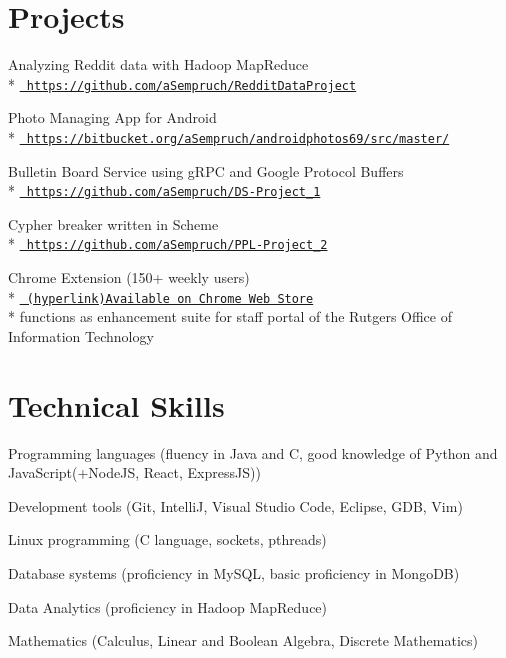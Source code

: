 \documentclass[letterpaper]{article}
\renewenvironment{itemize}{
  \begin{list}{}{
      \setlength{\leftmargin}{1.5em}
    }
  }{
  \end{list}
}
\begin{document}
\section*{Projects}

\begin{itemize}
  
  \item Analyzing Reddit data with Hadoop MapReduce \\*
  \href{https://github.com/aSempruch/RedditDataProject}{\tt
  https://github.com/aSempruch/RedditDataProject}

  \item Photo Managing App for Android \\*
  \href{https://bitbucket.org/aSempruch/androidphotos69/src/master/}{\tt
  https://bitbucket.org/aSempruch/androidphotos69/src/master/}
  
  \item Bulletin Board Service using gRPC and Google Protocol Buffers \\*
  \href{https://github.com/aSempruch/DS-Project_1}{\tt
  https://github.com/aSempruch/DS-Project\_1}
  
  \item Cypher breaker written in Scheme \\*
  \href{https://github.com/aSempruch/PPL-Project_2}{\tt
  https://github.com/aSempruch/PPL-Project\_2}

  \item Chrome Extension (150+ weekly users) \\*
  \href{https://chrome.google.com/webstore/detail/zedder/oclfiknhggkgkhibknacdlniepkggbal?hl=en}{\tt
  (hyperlink)Available on Chrome Web Store} \\*
  functions as enhancement suite for staff portal of the Rutgers Office of Information Technology

\end{itemize}

\section*{Technical Skills}

\begin{itemize} 
\hyphenchar{}
\item Programming languages (fluency in Java and C,
  good knowledge of Python and JavaScript(+NodeJS, React, ExpressJS))

\item Development tools (Git, IntelliJ, Visual Studio Code, Eclipse, GDB, Vim)

\item Linux programming (C language, sockets, pthreads)

\item Database systems (proficiency in MySQL, basic proficiency in MongoDB)

\item Data Analytics (proficiency in Hadoop MapReduce)

\item Mathematics (Calculus, Linear and Boolean Algebra, Discrete Mathematics)

\end{itemize}
\end{document}
